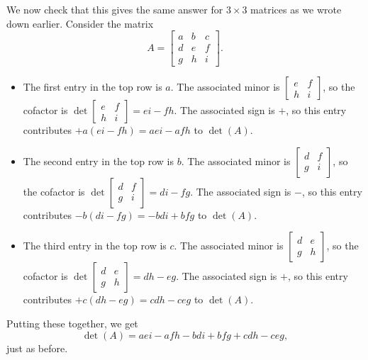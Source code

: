 \documentclass[a4paper]{book}
\newcommand{\bbm}       {\begin{bmatrix}}
\newcommand{\ebm}       {\end{bmatrix}}
\newcommand{\tm}        {\times}
\renewcommand{\:}{\colon}
\theoremstyle{definition}
\begin{document}
We now check that this gives the same answer for $3\tm 3$ matrices as
we wrote down earlier.  Consider the matrix
\[ A = \bbm a&b&c \\ d&e&f \\ g&h&i \ebm. \]
\begin{itemize}
 \item The first entry in the top row is $a$.  The associated minor is
  $\bbm e&f\\ h&i\ebm$, so the cofactor is
  $\det\bbm e&f\\ h&i\ebm=ei-fh$.  The associated sign is $+$, so this
  entry contributes $+a(ei-fh)=aei-afh$ to $\det(A)$.
 \item The second entry in the top row is $b$.  The associated minor is
  $\bbm d&f\\ g&i\ebm$, so the cofactor is
  $\det\bbm d&f\\ g&i\ebm=di-fg$.  The associated sign is $-$, so this
  entry contributes $-b(di-fg)=-bdi+bfg$ to $\det(A)$.
 \item The third entry in the top row is $c$.  The associated minor is
  $\bbm d&e\\ g&h\ebm$, so the cofactor is
  $\det\bbm d&e\\ g&h\ebm=dh-eg$.  The associated sign is $+$, so this
  entry contributes $+c(dh-eg)=cdh-ceg$ to $\det(A)$.
\end{itemize}
Putting these together, we get
\[ \det(A)=aei-afh-bdi+bfg+cdh-ceg, \]
just as before.
\end{document}
